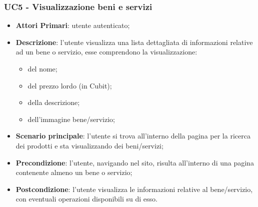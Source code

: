  \subsubsection{UC5 - Visualizzazione beni e servizi}
 \begin{itemize}
 	\item \textbf{Attori Primari}: utente autenticato;
 	\item \textbf{Descrizione}: l'utente visualizza una lista dettagliata di informazioni relative ad un bene o servizio, esse comprendono la visualizzazione:
 	\begin{itemize}
 		\item del nome;
 		\item del prezzo lordo (in Cubit\glo);
 		\item della descrizione;
 		\item dell'immagine bene/servizio;
 	\end{itemize}
 	\item \textbf{Scenario principale}: l'utente si trova all'interno della pagina per la ricerca dei prodotti e sta visualizzando dei beni/servizi;
 	
 	\item \textbf{Precondizione}: l'utente, navigando nel sito, risulta all'interno di una pagina contenente almeno un bene o servizio;
 	\item \textbf{Postcondizione}: l'utente visualizza le informazioni relative al bene/servizio, con eventuali operazioni disponibili su di esso.
 \end{itemize}
 